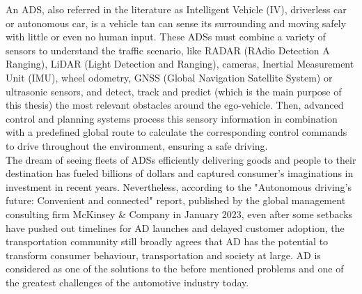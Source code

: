 An \ac{ADS}, also referred in the literature as Intelligent Vehicle (IV), driverless car or autonomous car, is a vehicle tan can sense its surrounding and moving safely with little or even no human input. These \acp{ADS} must combine a variety of sensors to understand the traffic scenario, like RADAR (RAdio Detection A Ranging), LiDAR (Light Detection and Ranging), cameras, Inertial Measurement Unit (IMU), wheel odometry, GNSS (Global Navigation Satellite System) or ultrasonic sensors, and detect, track and predict (which is the main purpose of this thesis) the most relevant obstacles around the ego-vehicle. Then, advanced control and planning systems process this sensory information in combination with a predefined global route to calculate the corresponding control commands to drive throughout the environment, ensuring a safe driving. \\

The dream of seeing fleets of \acp{ADS} efficiently delivering goods and people to their destination has fueled billions of dollars and captured consumer's imaginations in investment in recent years. Nevertheless, according to the "Autonomous driving's future: Convenient and connected" report, published by the global management consulting firm McKinsey \& Company in January 2023, even after some setbacks have pushed out timelines for \ac{AD} launches and delayed customer adoption, the transportation community still broadly agrees that \ac{AD} has the potential to transform consumer behaviour, transportation and society at large. \ac{AD} is considered as one of the solutions to the before mentioned problems and one of the greatest challenges of the automotive industry today. \\

